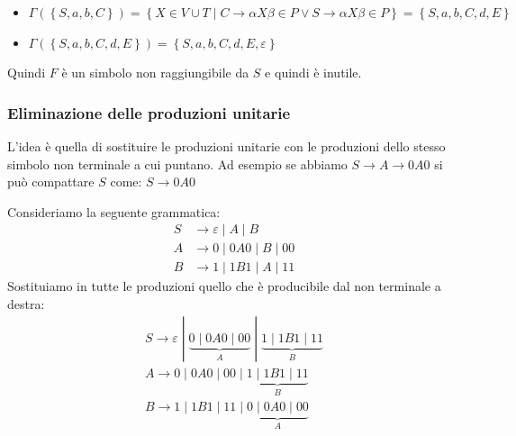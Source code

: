 \documentclass[a4paper]{article}
\begin{document}
\begin{enumerate}
\begin{example}
\begin{itemize}
          \item \( \Gamma(\left\{ S, a, b, C \right\}) = \left\{ X \in V \cup T \;\left|\;
          C \to \alpha X \beta \in P \vee S \to \alpha X \beta \in P \right. \right\}
          = \left\{ S, a, b, C, d, E \right\} \)

        \item \( \Gamma(\left\{ S, a, b, C, d, E \right\}) = \left\{ S, a, b, C, d, E, \varepsilon \right\} \)
        \end{itemize}
        Quindi \( F \) è un simbolo non raggiungibile da \( S \) e quindi è inutile.
      \end{example}
\end{enumerate}

\subsubsection{Eliminazione delle produzioni unitarie}
L'idea è quella di sostituire le produzioni unitarie con le produzioni
dello stesso simbolo non terminale a cui puntano. Ad esempio se abbiamo
\( S \to A \to 0A0 \) si può compattare \( S \) come:
\(
  S \to 0A0
\) 
\begin{example}
  Consideriamo la seguente grammatica:
  \[
    \begin{aligned}
      S &\to \varepsilon  \;|\; A \;|\; B\\
      A &\to  0\;|\; 0A0 \;|\; B \;|\; 00 \\
      B &\to 1 \;|\; 1B1 \;|\; A\;|\; 11
    \end{aligned}
  \] 
  Sostituiamo in tutte le produzioni quello che è producibile dal non terminale a destra:
  \[
    \begin{aligned}
      S \to \varepsilon \;|\; \underbrace{0 \;|\; 0A0 \;|\; 00}_{A} \;|\; \underbrace{1 \;|\; 1B1 \;|\; 11}_{B}\\
      A \to 0 \;|\; 0A0 \;|\; 00 \;|\; \underbrace{1 \;|\; 1B1 \;|\; 11}_{B}\\
      B \to 1 \;|\; 1B1 \;|\; 11 \;|\; \underbrace{0 \;|\; 0A0 \;|\; 00}_{A}
    \end{aligned}
  \] 
\end{example}
\end{document}
